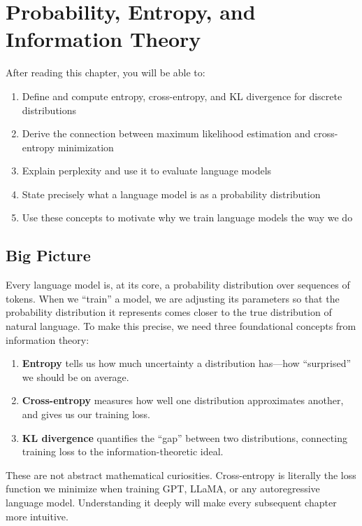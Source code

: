\chapter{Probability, Entropy, and Information Theory}
\label{ch:01}

\begin{keyinsight}
After reading this chapter, you will be able to:
\begin{enumerate}
  \item Define and compute entropy, cross-entropy, and KL divergence for discrete distributions
  \item Derive the connection between maximum likelihood estimation and cross-entropy minimization
  \item Explain perplexity and use it to evaluate language models
  \item State precisely what a language model is as a probability distribution
  \item Use these concepts to motivate why we train language models the way we do
\end{enumerate}
\end{keyinsight}

\section{Big Picture}
\label{ch:01:sec:big_picture}

Every language model is, at its core, a probability distribution over sequences of tokens. When we ``train'' a model, we are adjusting its parameters so that the probability distribution it represents comes closer to the true distribution of natural language. To make this precise, we need three foundational concepts from information theory:

\begin{enumerate}
  \item \textbf{Entropy} tells us how much uncertainty a distribution has---how ``surprised'' we should be on average.
  \item \textbf{Cross-entropy} measures how well one distribution approximates another, and gives us our training loss.
  \item \textbf{KL divergence} quantifies the ``gap'' between two distributions, connecting training loss to the information-theoretic ideal.
\end{enumerate}

These are not abstract mathematical curiosities. Cross-entropy is literally the loss function we minimize when training GPT, LLaMA, or any autoregressive language model. Understanding it deeply will make every subsequent chapter more intuitive.

